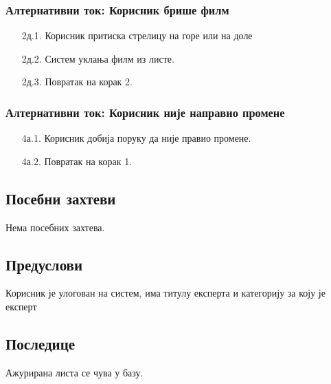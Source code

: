 \documentclass[12pt,a4paper]{article}
\begin{document}
\subsubsection{Алтернативни ток: Корисник брише филм} 
 \begin{enumerate}
        \item[2д.1.] Корисник притиска стрелицу на горе или на доле
        \item[2д.2.] Систем уклања филм из листе.
        \item[2д.3.] Повратак на корак 2.
\end{enumerate}

\subsubsection{Алтернативни ток: Корисник није направио промене} 
 \begin{enumerate}
        \item[4а.1.]Корисник добија поруку да није правио промене.
        \item[4а.2.] Повратак на корак 1.
\end{enumerate}

\subsection{Посебни захтеви}
Нема посебних захтева.
\subsection{Предуслови}
Корисник је улогован на систем, има титулу експерта и категорију за коју је експерт
 
 
\subsection{Последице}
Ажурирана листа се чува у базу. 
\end{document}
